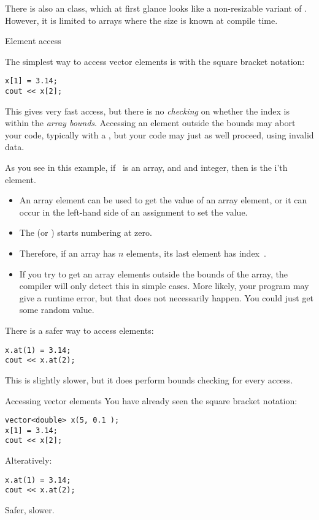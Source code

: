 \begin{remark}
  There is also an  class, which at first glance
  looks like a non-resizable variant of . However, it is limited to
  arrays where the size is known at compile time.
\end{remark}

 {Element access}

The simplest way to access vector elements is with the square bracket notation:
\begin{lstlisting}
x[1] = 3.14;
cout << x[2];
\end{lstlisting}
This gives very fast access, but there is no \emph{checking} on whether the
index is within the \emph{array
  bounds}. Accessing an element outside
the bounds may abort your code, typically with a
, but your code may just as well
proceed, using invalid data.

As you see in this example, if ~is an array, and  and
integer, then  is the i'th element.
\begin{itemize}
\item An array element  can be used to get the value of an
  array element, or it can occur in the left-hand side of an
  assignment to set the value.
\item The  (or
  )  starts numbering at zero.
\item Therefore, if an array has $n$ elements, its last element has
  index~.
\item If you try to get an array elements outside the bounds of the
  array, the compiler will only detect this in simple cases. More
  likely, your program may give a runtime error, but that does not
  necessarily happen. You could just get some random value.
\end{itemize}

There is a safer way to access elements:
\begin{lstlisting}
x.at(1) = 3.14;
cout << x.at(2);  
\end{lstlisting}
This is slightly slower, but it does perform bounds checking for every access.

\begin{slide}{Accessing vector elements}
  \label{sl:vectorsub}
  You have already seen the square bracket notation:
\begin{lstlisting}
vector<double> x(5, 0.1 );
x[1] = 3.14;
cout << x[2];
\end{lstlisting}
Alteratively:
\begin{lstlisting}
x.at(1) = 3.14;
cout << x.at(2);
\end{lstlisting}
Safer, slower.
\end{slide}

